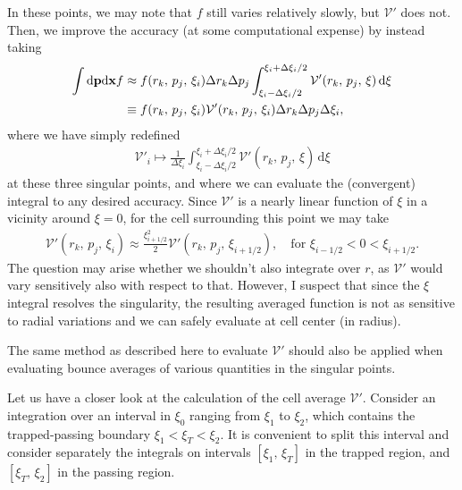 \documentclass[11pt,a4paper]{article}
\newcommand{\rd}{\ensuremath{\mathrm{d}}}
\newcommand{\Vp}{\ensuremath{\mathcal{V}'} }
\renewcommand{\b}[1]{\ensuremath{ {\bf #1 } }}
\begin{document}
In these points, we may note that $f$ still varies relatively slowly, but \Vp{} does not. Then, we improve the accuracy (at some computational expense) by instead taking
\begin{align}
\int \rd \b{p} \rd \b{x}  f &\approx f(r_k,\, p_j ,\,\xi_i) \Delta r_k \Delta p_j \int_{\xi_i-\Delta \xi_i/2}^{\xi_i+\Delta \xi_i/2} \Vp(r_k,\,p_j,\,\xi) \,\rd\xi \nonumber \\
&\equiv f(r_k,\,p_j,\,\xi_i) \mathcal{V}'(r_k,\,p_j,\,\xi_i) \Delta r_k \Delta p_j \Delta \xi_i,
\end{align}
where we have simply redefined
\begin{align}
\Vp_i \mapsto \frac{1}{\Delta \xi_i}\int_{\xi_i-\Delta \xi_i/2}^{\xi_i+\Delta \xi_i/2} \Vp(r_k,\,p_j,\,\xi) \,\rd\xi 
\end{align}
at these three singular points, and where we can evaluate the (convergent) integral to any desired accuracy. Since \Vp{} is a nearly linear function of $\xi$ in a vicinity around $\xi=0$, for the cell surrounding this point we may take
\begin{align}
\Vp(r_k,\,p_j,\,\xi_i) \approx \frac{\xi_{i+1/2}^2}{2} \Vp(r_k,\,p_j,\,\xi_{i+1/2}), \quad \text{for } \xi_{i-1/2} < 0 < \xi_{i+1/2}.
\end{align}
The question may arise whether we shouldn't also integrate over $r$, as \Vp would vary sensitively also with respect to that. However, I suspect that since the $\xi$ integral resolves the singularity, the resulting averaged function is not as sensitive to radial variations and we can safely evaluate at cell center (in radius).

The same method as described here to evaluate \Vp should also be applied when evaluating bounce averages of various quantities in the singular points.

Let us have a closer look at the calculation of the cell average $\mathcal{V}'$. Consider an integration over an interval in $\xi_0$ ranging from $\xi_1$ to $\xi_2$, which contains the trapped-passing boundary $\xi_1 < \xi_T < \xi_2$. It is convenient to split this interval and consider separately the integrals on intervals $[\xi_1,\,\xi_T]$ in the trapped region, and $[\xi_T,\,\xi_2]$ in the passing region. 
\end{document}
